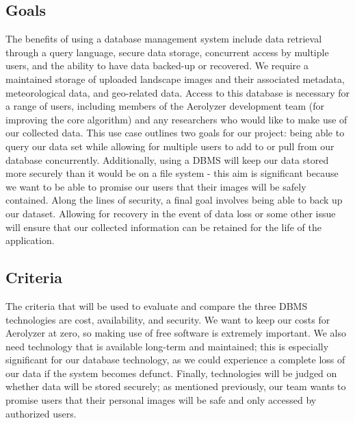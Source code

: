 \documentclass[onecolumn, draftclsnofoot,10pt, compsoc]{IEEEtran}
\begin{document}
\begin{flushleft}
\subsection{Goals}
The benefits of using a database management system include data retrieval through a query language, secure data storage, concurrent access by multiple users, and the ability to have data backed-up or recovered. We require a maintained storage of uploaded landscape images and their associated metadata, meteorological data, and geo-related data. Access to this database is necessary for a range of users, including members of the Aerolyzer development team (for improving the core algorithm) and any researchers who would like to make use of our collected data. This use case outlines two goals for our project: being able to query our data set while allowing for multiple users to add to or pull from our database concurrently. Additionally, using a DBMS will keep our data stored more securely than it would be on a file system - this aim is significant because we want to be able to promise our users that their images will be safely contained. Along the lines of security, a final goal involves being able to back up our dataset. Allowing for recovery in the event of data loss or some other issue will ensure that our collected information can be retained for the life of the application.



\subsection{Criteria}
The criteria that will be used to evaluate and compare the three DBMS technologies are cost, availability, and security. We want to keep our costs for Aerolyzer at zero, so making use of free software is extremely important. We also need technology that is available long-term and maintained; this is especially significant for our database technology, as we could experience a complete loss of our data if the system becomes defunct. Finally, technologies will be judged on whether data will be stored securely; as mentioned previously, our team wants to promise users that their personal images will be safe and only accessed by authorized users. 

\medskip


\end{flushleft}
\end{document}
